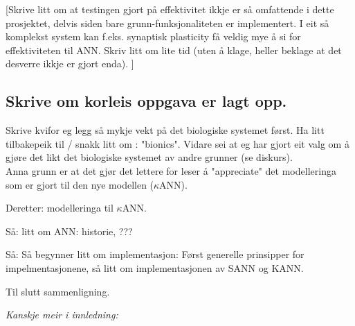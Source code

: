 





[Skrive litt om at testingen gjort på effektivitet ikkje er så omfattende i dette prosjektet, delvis siden bare grunn-funksjonaliteten er implementert.
I eit så komplekst system kan f.eks. synaptisk plasticity få veldig mye å si for effektiviteten til ANN. Skriv litt om lite tid (uten å klage, heller beklage at det desverre ikkje er gjort enda).
]

\subsection{Skrive om korleis oppgava er lagt opp.}
Skrive kvifor eg legg så mykje vekt på det biologiske systemet først. Ha litt tilbakepeik til / snakk litt om : "bionics". Vidare sei at eg har gjort eit valg om å gjøre det likt det biologiske systemet av andre grunner (se diskurs).\\
Anna grunn er at det gjør det lettere for leser å "appreciate" det modelleringa som er gjort til den nye modellen ($\kappa$ANN).

Deretter: modelleringa til $\kappa$ANN.

Så: litt om ANN: historie, ???

Så: Så begynner litt om implementasjon: Først generelle prinsipper for impelmentasjonene, så litt om implementasjonen av SANN og KANN.

Til slutt sammenligning.


\emph{Kanskje meir i innledning:}

